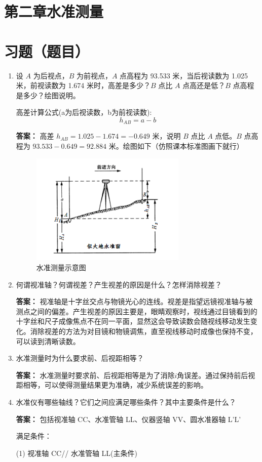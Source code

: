 \documentclass[12pt,a4paper]{article}
\newcounter{question}
\newenvironment{questions}{
    \setcounter{question}{0}
    \section*{习题（题目）}
    \begin{enumerate}[leftmargin=1.5em,label={\arabic*．}]
}{
    \end{enumerate}
}
\newcommand{\answer}[1]{\par\noindent\textbf{答案：} #1\par\vspace{1em}}
\begin{document}
\section*{第二章\quad 水准测量}
\begin{questions}
    \item 设 \( A \) 为后视点，\( B \) 为前视点，\( A \) 点高程为 93.533 米，当后视读数为 1.025 米，前视读数为 1.674 米时，高差是多少？\( B \) 点比 \( A \) 点高还是低？\( B \) 点高程是多少？绘图说明。
    
    高差计算公式(a为后视读数，b为前视读数):
    $$h_{AB} = a - b$$

    \answer{高差 \( h_{AB} = 1.025 - 1.674 = -0.649 \) 米，说明 \( B \) 点比 \( A \) 点低。\( B \) 点高程为 \( 93.533 - 0.649 = 92.884 \) 米。绘图如下（仿照课本标准图画下就行）}
    \begin{figure}[H]
        \centering
        \includegraphics[width = 0.7\textwidth]{./figures/1.png}
        \caption{水准测量示意图}
    \end{figure}
    \item 何谓视准轴？何谓视差？产生视差的原因是什么？怎样消除视差？
    \answer{视准轴是十字丝交点与物镜光心的连线。视差是指望远镜视准轴与被测点之间的偏差。产生视差的原因主要是，眼睛观察时，视线通过目镜看到的十字丝和尺子成像焦点不在同一平面，显然这会导致读数会随视线移动发生变化。消除视差的方法为对目镜和物镜调焦，直至视线移动时成像也保持不变，可以读到清晰读数。}
    \item 水准测量时为什么要求前、后视距相等？
    \answer{水准测量时要求前、后视距相等是为了消除$i$角误差。通过保持前后视距相等，可以使得测量结果更为准确，减少系统误差的影响。}
    \item 水准仪有哪些轴线？它们之间应满足哪些条件？其中主要条件是什么？
    \answer{包括视准轴 CC、水准管轴 LL、仪器竖轴 VV、圆水准器轴 L'L'}
    满足条件：

(1) 视准轴 CC// 水准管轴 LL(主条件)


\end{questions}
\end{document}
